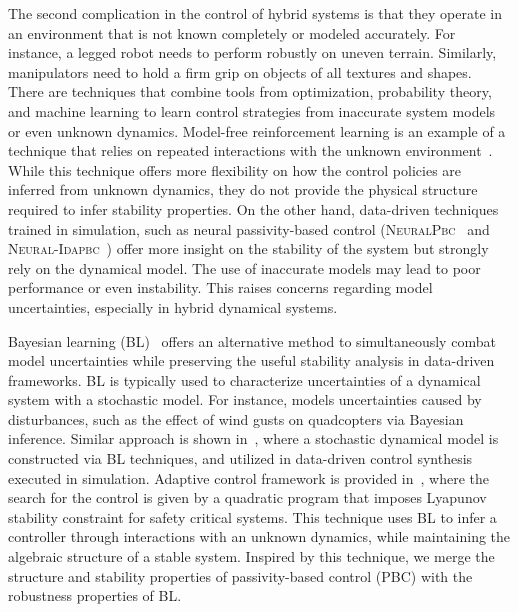 The second complication in the control of hybrid systems is that they operate in
an environment that is not known completely or modeled accurately.
%
For instance, a legged robot needs to perform robustly on uneven terrain.
Similarly, manipulators need to hold a firm grip on objects of all textures and
shapes.
%
There are techniques that combine tools from optimization, probability theory,
and machine learning to learn control strategies from inaccurate system models
or even unknown dynamics.
%
Model-free reinforcement learning is an example of a technique that relies on
repeated interactions with the unknown
environment~\cite{heess2017emergence,andrychowicz2020learning,lillicrap2015continuous}.
%
While this technique offers more flexibility on how the control policies are
inferred from unknown dynamics, they do not provide the physical structure
required to infer stability properties.
%
On the other hand, data-driven techniques trained in simulation, such as neural
passivity-based control (\textsc{NeuralPbc}~\cite{ashenafi2022robust} and
\textsc{Neural-Idapbc}~\cite{sirichotiyakul2022data}) offer more insight on the stability
of the system but strongly rely on the dynamical model.
%
The use of inaccurate models may lead to poor performance or even instability.
%
This raises concerns regarding model uncertainties, especially in hybrid dynamical
systems.
%

Bayesian learning (BL)~\cite{gal2016improving,thakur} offers an alternative
method to simultaneously combat model uncertainties while preserving the useful
stability analysis in data-driven frameworks.
%
BL is typically used to characterize uncertainties of a dynamical system with a
stochastic model.
%
For instance, \cite{sadigh2015safe} models uncertainties caused by disturbances,
such as the effect of wind gusts on quadcopters via Bayesian inference.
%
Similar approach is shown in~\cite{shen2022online, pmlr-v54-linderman17a}, where
a stochastic dynamical model is constructed via BL techniques, and utilized in
data-driven control synthesis executed in simulation. 
%
%
%
Adaptive control framework is provided in~\cite{fan2020bayesian}, where the
search for the control is given by a quadratic program that imposes
Lyapunov stability constraint for safety critical systems.
%
This technique uses BL to infer a controller through interactions with an
unknown dynamics, while maintaining the algebraic structure of a stable system.
%
Inspired by this technique, we merge the structure and stability properties of
passivity-based control (PBC) with the robustness properties of BL.  


